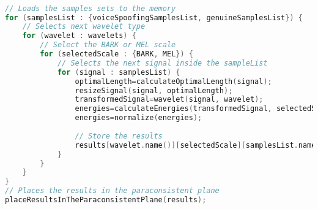 \begin{lstlisting}[language=C++, caption={Procedure 1 algorithm}, label={lst:experiment01Algo}]

// Loads the samples sets to the memory
for (samplesList : {voiceSpoofingSamplesList, genuineSamplesList}) {
	// Selects next wavelet type
	for (wavelet : wavelets) {
		// Select the BARK or MEL scale
		for (selectedScale : {BARK, MEL}) {
			// Selects the next signal inside the sampleList
			for (signal : samplesList) {
				optimalLength=calculateOptimalLength(signal);
				resizeSignal(signal, optimalLength);
				transformedSignal=wavelet(signal, wavelet);
				energies=calculateEnergies(transformedSignal, selectedScale);
				energies=normalize(energies);
				
				// Store the results
				results[wavelet.name()][selectedScale][samplesList.name()].add(energies);
			}
		}
	}
}
// Places the results in the paraconsistent plane
placeResultsInTheParaconsistentPlane(results);
\end{lstlisting}